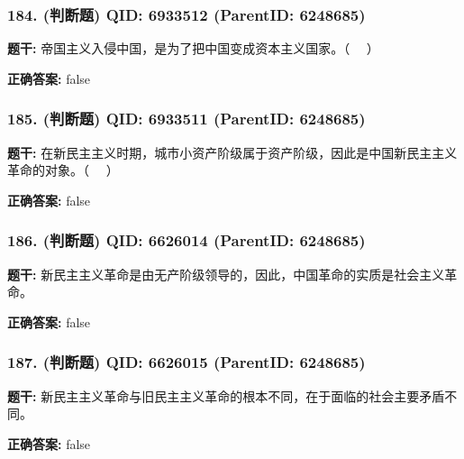 \documentclass[12pt,UTF8]{ctexart}
\begin{document}
\subsubsection*{184. (判断题) \small QID: 6933512 (ParentID: 6248685)}

\textbf{题干:}
帝国主义入侵中国，是为了把中国变成资本主义国家。（   ）



\textbf{正确答案:}
false

\vspace{0.3em}\hrulefill\vspace{0.7em}

\subsubsection*{185. (判断题) \small QID: 6933511 (ParentID: 6248685)}

\textbf{题干:}
在新民主主义时期，城市小资产阶级属于资产阶级，因此是中国新民主主义革命的对象。（   ）



\textbf{正确答案:}
false

\vspace{0.3em}\hrulefill\vspace{0.7em}

\subsubsection*{186. (判断题) \small QID: 6626014 (ParentID: 6248685)}

\textbf{题干:}
新民主主义革命是由无产阶级领导的，因此，中国革命的实质是社会主义革命。



\textbf{正确答案:}
false

\vspace{0.3em}\hrulefill\vspace{0.7em}

\subsubsection*{187. (判断题) \small QID: 6626015 (ParentID: 6248685)}

\textbf{题干:}
新民主主义革命与旧民主主义革命的根本不同，在于面临的社会主要矛盾不同。



\textbf{正确答案:}
false

\vspace{0.3em}\hrulefill\vspace{0.7em}
\end{document}
